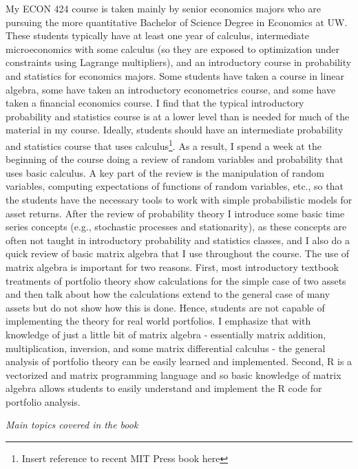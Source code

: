 \documentclass[
  letterpaper,
  DIV=11,
  numbers=noendperiod]{scrreprt}
\theoremstyle{definition}
\theoremstyle{definition}
\theoremstyle{remark}
\begin{document}
My ECON 424 course is taken mainly by senior economics majors who are
pursuing the more quantitative Bachelor of Science Degree in Economics
at UW. These students typically have at least one year of calculus,
intermediate microeconomics with some calculus (so they are exposed to
optimization under constraints using Lagrange multipliers), and an
introductory course in probability and statistics for economics majors.
Some students have taken a course in linear algebra, some have taken an
introductory econometrics course, and some have taken a financial
economics course. I find that the typical introductory probability and
statistics course is at a lower level than is needed for much of the
material in my course. Ideally, students should have an intermediate
probability and statistics course that uses calculus\footnote{Insert
  reference to recent MIT Press book here}. As a result, I spend a week
at the beginning of the course doing a review of random variables and
probability that uses basic calculus. A key part of the review is the
manipulation of random variables, computing expectations of functions of
random variables, etc., so that the students have the necessary tools to
work with simple probabilistic models for asset returns. After the
review of probability theory I introduce some basic time series concepts
(e.g., stochastic processes and stationarity), as these concepts are
often not taught in introductory probability and statistics classes, and
I also do a quick review of basic matrix algebra that I use throughout
the course. The use of matrix algebra is important for two reasons.
First, most introductory textbook treatments of portfolio theory show
calculations for the simple case of two assets and then talk about how
the calculations extend to the general case of many assets but do not
show how this is done. Hence, students are not capable of implementing
the theory for real world portfolios. I emphasize that with knowledge of
just a little bit of matrix algebra - essentially matrix addition,
multiplication, inversion, and some matrix differential calculus - the
general analysis of portfolio theory can be easily learned and
implemented. Second, R is a vectorized and matrix programming language
and so basic knowledge of matrix algebra allows students to easily
understand and implement the R code for portfolio analysis.

\emph{Main topics covered in the book}
\end{document}
